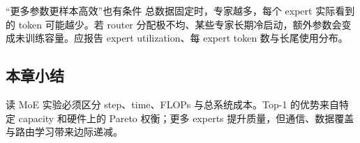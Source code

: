 
\begin{warningbox}{“更多参数更样本高效”也有条件}
总数据固定时，专家越多，每个 expert 实际看到的 token 可能越少。若 router 分配极不均、某些专家长期冷启动，额外参数会变成未训练容量。应报告 expert utilization、每 expert token 数与长尾使用分布。
\end{warningbox}

\subsection{本章小结}

读 MoE 实验必须区分 step、time、FLOPs 与总系统成本。Top-1 的优势来自特定 capacity 和硬件上的 Pareto 权衡；更多 experts 提升质量，但通信、数据覆盖与路由学习带来边际递减。

